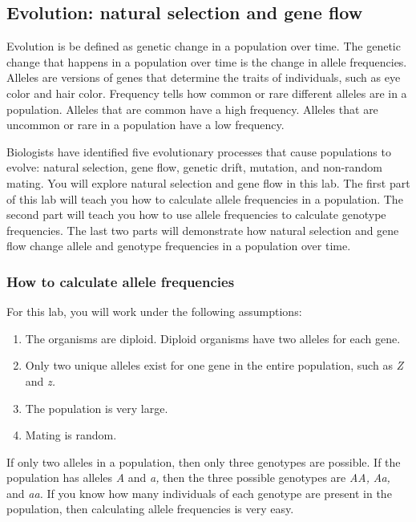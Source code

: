 \documentclass[12pt]{exam}
\newcommand{\allele}[1]{\textit{#1}}
\begin{document}
\subsection*{Evolution: natural selection and gene flow }

Evolution is be defined as genetic change in a population over time. The genetic change that happens in a population over time is the change in allele frequencies. Alleles are versions of genes that determine the traits of individuals, such as eye color and hair color. Frequency tells how common or rare different alleles are in a population. Alleles that are common have a high frequency. Alleles that are uncommon or rare in a population have a low frequency.  

Biologists have identified five evolutionary processes that cause populations to evolve: natural selection, gene flow, genetic drift, mutation, and non-random mating. You will explore natural selection and gene flow in this lab.  The first part of this lab will teach you how to calculate allele frequencies in a population. The second part will teach you how to use allele frequencies to calculate genotype frequencies.  The last two parts will demonstrate how natural selection and gene flow change allele and genotype frequencies in a population over time. 

\subsubsection*{How to calculate allele frequencies}

For this lab, you will work under the following assumptions:

\begin{enumerate}

	\item The organisms are diploid. Diploid organisms have two alleles for each gene.
	
	\item Only two unique alleles exist for one gene in the entire population, such as \allele{Z} and \allele{z.}
	
	\item The population is very large.
	
	\item Mating is random.
	
\end{enumerate}

If only two alleles in a population, then only three genotypes are possible. If the population has alleles \allele{A} and \allele{a,} then the three possible genotypes are \allele{AA,} \allele{Aa,} and \allele{aa.}  If you know how many individuals of each genotype are present in the population, then calculating allele frequencies is very easy. 
\end{document}
